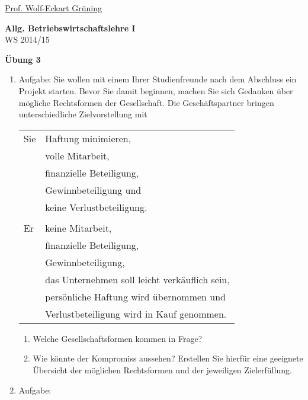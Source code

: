 \documentclass[12pt,a4paper]{scrreprt}
\begin{document}
 
\begin{flushleft}
\href{gruening@informatik.htw-dresden.de}{Prof. Wolf-Eckart Grüning}
\end{flushleft}

\begin{center}
\large{\textbf{ Allg. Betriebswirtschaftslehre I}} \\
WS 2014/15 \end{center}

\begin{center}\large{\textbf{ Übung 3 }} \end{center}

\bigskip
\begin{enumerate}%

 	\item{Aufgabe:}
 	Sie wollen mit einem Ihrer Studienfreunde nach dem Abschluss ein Projekt starten. Bevor Sie damit
beginnen, machen Sie sich Gedanken über mögliche Rechtsformen der Gesellschaft. Die
Geschäftspartner bringen unterschiedliche Zielvorstellung mit

	\begin{tabular}{ll}
	Sie 
		& Haftung minimieren, \\
		& volle Mitarbeit, \\
		& finanzielle Beteiligung, \\
		& Gewinnbeteiligung und \\
		& keine Verlustbeteiligung. \\
\\
	Er
		& keine Mitarbeit, \\
		& finanzielle Beteiligung, \\
		& Gewinnbeteiligung, \\
		& das Unternehmen soll leicht verkäuflich sein, \\
		& persönliche Haftung wird übernommen und \\
		& Verlustbeteiligung wird in Kauf genommen.
	\end{tabular}

	\begin{enumerate} 
		\item Welche Gesellschaftsformen kommen in Frage?
		\item Wie könnte der Kompromiss aussehen? Erstellen Sie hierfür eine geeignete Übersicht der
möglichen Rechtsformen und der jeweiligen Zielerfüllung.
	\end{enumerate} 

 	\item{Aufgabe:}


\end{enumerate}
\end{document}

